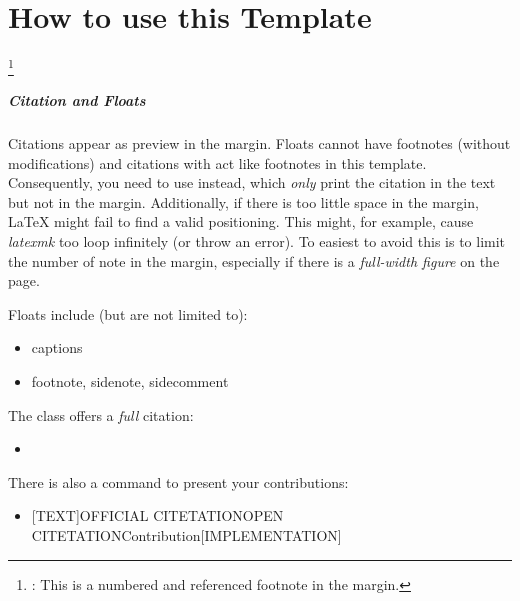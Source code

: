 


\chapter{How to use this Template}


\lipsum[1-1]%
\footnote{\detokenize{\footnote}: This is a numbered and referenced footnote in the margin.} 
\lipsum[2-2]%


\paragraph{Citation and Floats}

Citations \cite{cryptoeprint:2021/1484} appear as preview in the margin. 
Floats cannot have footnotes (without modifications) and citations with \detokenize{\cite} act like footnotes in this template. 
Consequently, 
you need to use \detokenize{\citeonly} instead, 
which \emph{only} print the citation in the text but not in the margin. 
Additionally, 
if there is too little space in the margin, 
LaTeX might fail to find a valid positioning. 
This might, for example, cause \emph{latexmk} too loop infinitely (or throw an error). 
To easiest to avoid this is to limit the number of note in the margin, especially if there is a \emph{full-width figure} on the page.


Floats include (but are not limited to):
\begin{itemize}
	\item captions
	\item footnote, sidenote, sidecomment
\end{itemize}

The class offers a \emph{full} citation:
\begin{itemize}
 	\item \detokenize{\fullfullcite}
 \end{itemize} 


There is also a command to present your contributions:

\begin{itemize}
	\item \detokenize{\contentsource}[TEXT]{OFFICIAL CITETATION}{OPEN CITETATION}{Contribution}[IMPLEMENTATION]
\end{itemize}


